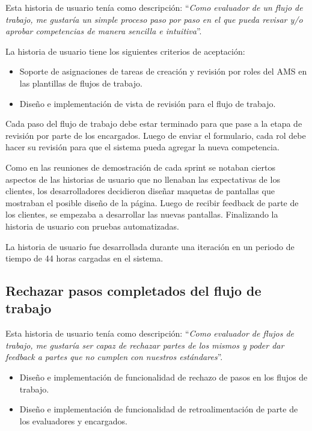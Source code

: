 Esta historia de usuario tenía como descripción: \enquote{\textit{Como evaluador de un flujo de trabajo, me gustaría un simple proceso paso por paso en el que pueda revisar y/o aprobar competencias de manera sencilla e intuitiva}}.

La historia de usuario tiene los siguientes criterios de aceptación:
\begin{itemize}
	\item Soporte de asignaciones de tareas de creación y revisión por roles del AMS en las plantillas de flujos de trabajo.
	\item Diseño e implementación de vista de revisión para el flujo de trabajo.
\end{itemize}

Cada paso del flujo de trabajo debe estar terminado para que pase a la etapa de revisión por parte de los encargados. Luego de enviar el formulario, cada rol debe hacer su revisión para que el sistema pueda agregar la nueva competencia.

Como en las reuniones de demostración de cada sprint se notaban ciertos aspectos de las historias de usuario que no llenaban las expectativas de los clientes, los desarrolladores decidieron diseñar maquetas de pantallas que mostraban el posible diseño de la página. Luego de recibir feedback de parte de los clientes, se empezaba a desarrollar las nuevas pantallas. Finalizando la historia de usuario con pruebas automatizadas.

La historia de usuario fue desarrollada durante una iteración en un periodo de tiempo de 44 horas cargadas en el sistema.

\subsection{Rechazar pasos completados del flujo de trabajo}
Esta historia de usuario tenía como descripción: \enquote{\textit{Como evaluador de flujos de trabajo, me gustaría ser capaz de rechazar partes de los mismos y poder dar feedback a partes que no cumplen con nuestros estándares}}.

\begin{itemize}
	\item Diseño e implementación de funcionalidad de rechazo de pasos en los flujos de trabajo.
	\item Diseño e implementación de funcionalidad de retroalimentación de parte de los evaluadores y encargados.
\end{itemize}

